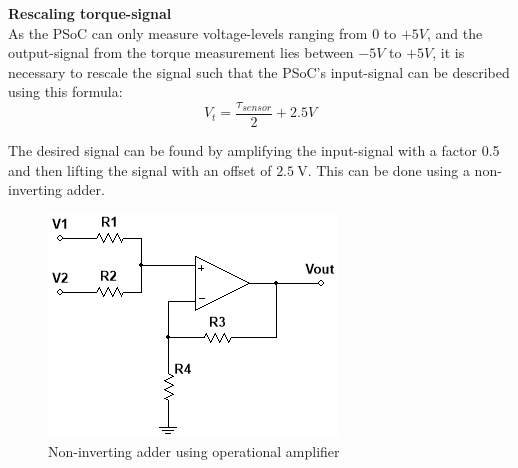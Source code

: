 \textbf{Rescaling torque-signal}\\
As the PSoC can only measure voltage-levels ranging from $0$ to $+5 V$, and the output-signal from the torque measurement lies between $-5 V$ to $+5 V$, it is necessary to rescale the signal such that the PSoC's input-signal can be described using this formula:
\begin{equation}
	V_t = \frac{\tau_{sensor} }{2} + 2.5 V
\end{equation}

The desired signal can be found by amplifying the input-signal with a factor 0.5 and then lifting the signal with an offset of $\SI{2.5}{\volt}$. This can be done using a non-inverting adder.

\begin{figure}[H]
	\centering
	\includegraphics[width=0.4\linewidth]{Hardware/SignalConverter/TorqueDesign1}
	\caption{Non-inverting adder using operational amplifier}
	\label{fig:SignalConverterTorque1}
\end{figure}


